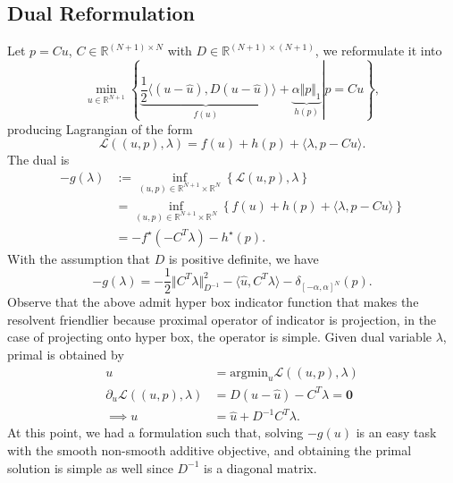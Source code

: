 \documentclass[]{article}
\theoremstyle{definition}
\numberwithin{equation}{subsection}
\begin{document}
    \subsection*{Dual Reformulation}
        Let $p = Cu$, $C\in \mathbb R^{(N + 1)\times N}$ with $D \in \mathbb R^{(N + 1)\times (N + 1)}$, we reformulate it into 
        \[
            \min_{u\in \mathbb R^{N + 1}}     
            \left\lbrace
                \left.
                    \underbrace{\frac{1}{2}\langle (u - \hat u), D(u - \hat u)}_{f(u)}\rangle 
                    + 
                    \underbrace{\alpha \Vert p\Vert_1}_{h(p)}
                \right| 
                p = Cu
            \right\rbrace, 
        \]
        producing Lagrangian of the form 
        \[
            \mathcal L((u, p), \lambda) = 
            f(u) + h(p) + \langle \lambda, p - Cu\rangle. 
        \]
        The dual is
        \begin{align*}
            - g(\lambda) &:= \inf_{(u, p)\in \mathbb R^{N + 1}\times \mathbb R^N}
            \left\lbrace
                \mathcal L{(u, p), \lambda}
            \right\rbrace
            \\
            &= \inf_{(u, p)\in \mathbb R^{N + 1}\times \mathbb R^N}
            \left\lbrace
                f(u) + h(p) + \langle \lambda, p - Cu\rangle
            \right\rbrace
            \\
            &= 
            -f^\star (-C^T\lambda) - h^\star(p). 
        \end{align*}
        With the assumption that $D$ is positive definite, we have 
        \[
            - g(\lambda) = -\frac{1}{2}    \Vert C^T\lambda\Vert^2_{D^{-1}} - 
            \langle \hat u, C^T \lambda\rangle - 
            \delta_{[-\alpha, \alpha]^N}(p). 
        \]
        Observe that the above admit hyper box indicator function that makes the resolvent friendlier because proximal operator of indicator is projection, in the case of projecting onto hyper box, the operator is simple. 
        Given dual variable $\lambda$, primal is obtained by 
        \begin{align*}
            u &= \text{argmin}_u \mathcal L((u, p), \lambda) 
            \\
            \partial_u \mathcal L((u, p), \lambda) &= D(u - \hat u) - C^T\lambda = \mathbf 0
            \\
            \implies u &= \hat u + D^{-1}C^T\lambda. 
        \end{align*}
        At this point, we had a formulation such that, solving $-g(u)$ is an easy task with the smooth non-smooth additive objective, and obtaining the primal solution is simple as well since $D^{-1}$ is a diagonal matrix. 
\end{document}
